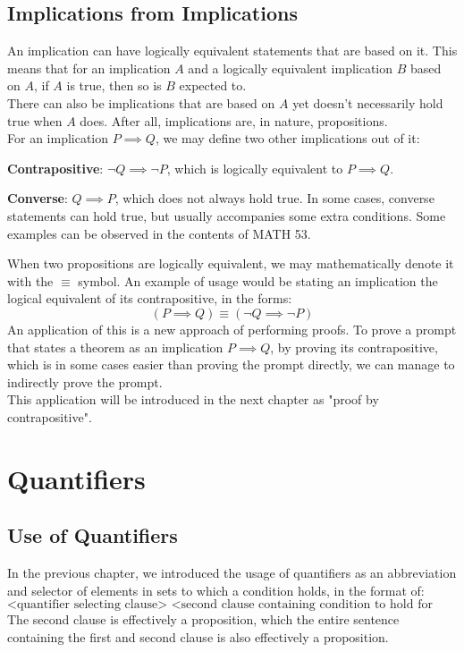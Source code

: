 \subsection{Implications from Implications}
An implication can have logically equivalent statements that are based on it. This means that for an implication $A$ and a logically equivalent implication $B$ based on $A$, if $A$ is true, then so is $B$ expected to. \\
There can also be implications that are based on $A$ yet doesn't necessarily hold true when $A$ does. After all, implications are, in nature, propositions. \\

For an implication $P \implies Q$, we may define two other implications out of it:
\begin{bindenum}
    \item \textbf{Contrapositive}: $\neg Q \implies \neg P$, which is logically equivalent to $P \implies Q$.
    \item \textbf{Converse}: $Q \implies P$, which does not always hold true. In some cases, converse statements can hold true, but usually accompanies some extra conditions. Some examples can be observed in the contents of MATH 53.
\end{bindenum}

When two propositions are logically equivalent, we may mathematically denote it with the $\equiv$ symbol. An example of usage would be stating an implication the logical equivalent of its contrapositive, in the forms:
\[(P \implies Q) \equiv (\neg Q \implies \neg P)\]
An application of this is a new approach of performing proofs. To prove a prompt that states a theorem as an implication $P \implies Q$, by proving its contrapositive, which is in some cases easier than proving the prompt directly, we can manage to indirectly prove the prompt. \\
This application will be introduced in the next chapter as "proof by contrapositive".

\section{Quantifiers}

\subsection{Use of Quantifiers}
In the previous chapter, we introduced the usage of quantifiers as an abbreviation and selector of elements in sets to which a condition holds, in the format of:
\[\text{<quantifier selecting clause> <second clause containing condition to hold for selected values>}\]
The second clause is effectively a proposition, which the entire sentence containing the first and second clause is also effectively a proposition.

